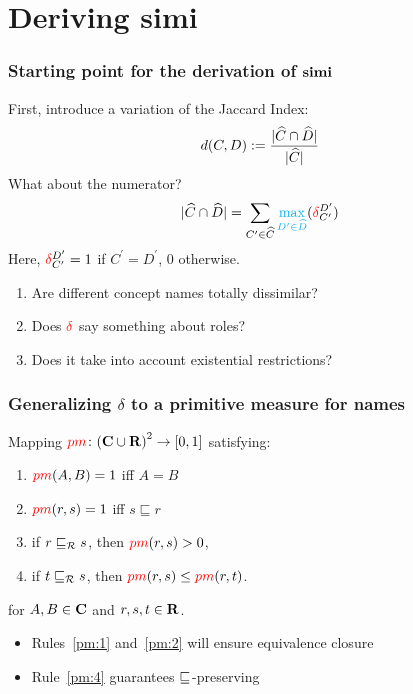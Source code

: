 \documentclass[smaller]{beamer}
\begin{document}
\section{Deriving simi}

\begin{frame}
  \frametitle{Starting point for the derivation of \(\operatorname{\mathbf{simi}}\)}
  First, introduce a variation of the \alert{Jaccard Index}:
  \begin{equation}
    d(C,D) := \frac{\abs{\atom{C} \cap \atom{D}}}%
                   {\abs{\atom{C}}}
  \end{equation}
  What about the numerator?
  \begin{equation}
    \abs{\atom{C} \cap \atom{D}} =
    \sum_{C^\prime \in \atom{C}}%
      \textcolor{cyan}{\max_{D^\prime \in \atom{D}}}%
      (\textcolor{red}{\delta}_{C^\prime}^{D^\prime})
  \end{equation}
  Here, \(\textcolor{red}{\delta}_{C^\prime}^{D^\prime} = 1\) if
  \(C^\prime = D^\prime\), \(0\) otherwise.
  \pause
  \begin{enumerate}[<+->]
    \item Are different concept names totally dissimilar?
    \item Does \(\textcolor{red}{\delta}\) say something about roles?
    \item Does it take into account existential restrictions?
  \end{enumerate}
\end{frame}

\begin{frame}
  \frametitle{Generalizing \(\delta{}\) to a primitive measure for names}
  \begin{definition}
    Mapping \(\textcolor{red}{pm} \colon {(\mathbf{C}\cup \mathbf{R})}^2 \to [0,1]\)
    satisfying:
    \begin{enumerate}[<+->]
      \item\label{pm:1} \(\textcolor{red}{pm}(A,B) = 1\) iff \(A = B\)
      \item\label{pm:2} \(\textcolor{red}{pm}(r,s) = 1\) iff \(s \sqsubseteq r\)
      \item\label{pm:3} if \(r \sqsubseteq_{\mathcal{R}} s\), then \(\textcolor{red}{pm}(r,s) > 0\),
      \item\label{pm:4} if \(t \sqsubseteq_{\mathcal{R}} s\), then \(\textcolor{red}{pm}(r,s) \le \textcolor{red}{pm}(r,t)\).
    \end{enumerate}
    for \(A,B \in \mathbf{C}\) and \(r,s,t \in \mathbf{R}\).
  \end{definition}
  \begin{itemize}[<+->]
    \item Rules~\ref{pm:1} and~\ref{pm:2} will 
    ensure equivalence closure
    \item Rule~\ref{pm:4} guarantees
    \(\sqsubseteq_{\mathcal{}}\)-preserving
  \end{itemize}
\end{frame}
\end{document}
